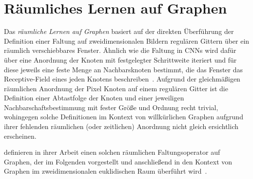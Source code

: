 \chapter{Räumliches Lernen auf Graphen}
\label{raeumliches_lernen}

Das \emph{räumliche Lernen auf Graphen} basiert auf der direkten Überführung der Definition einer Faltung auf zweidimensionalen Bildern \bzw{} regulären Gittern über ein räumlich verschiebbares Fenster.
Ähnlich wie die Faltung in \glspl{CNN} wird dafür über eine Anordnung der Knoten mit festgelegter Schrittweite iteriert und für diese jeweils eine feste Menge an Nachbarsknoten bestimmt, die das Fenster \bzw{} das Receptive-Field eines jeden Knotens beschreiben~\cite{patchy}.
Aufgrund der gleichmäßigen räumlichen Anordnung der Pixel \bzw{} Knoten auf einem regulären Gitter ist die Definition einer Abtastfolge der Knoten und einer jeweiligen Nachbarschaftsbestimmung mit fester Größe und Ordnung recht trivial, wohingegen solche Definitionen im Kontext von willkürlichen Graphen aufgrund ihrer \ggf{} fehlenden räumlichen (oder zeitlichen) Anordnung nicht gleich ersichtlich erscheinen.

\citeauthor{patchy} definieren in ihrer Arbeit einen solchen räumlichen Faltungsoperator auf Graphen, der im Folgenden vorgestellt und anschließend in den Kontext von Graphen im zweidimensionalen euklidischen Raum überführt wird~\cite{patchy}.





